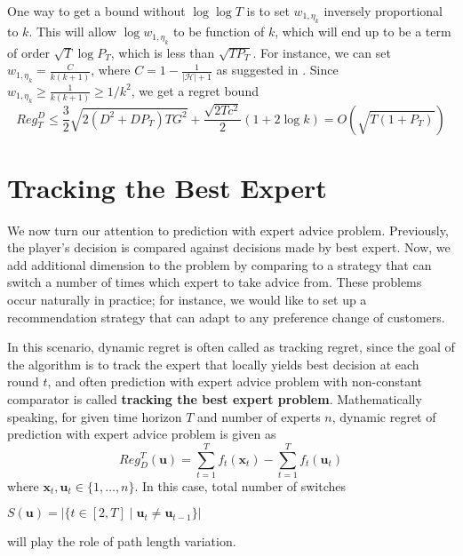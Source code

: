 \documentclass[12pt, a4paper]{report}
\begin{document}
One way to get a bound without $\log \log T$ is to set $w_{1, \eta_k}$ inversely proportional to $k$. This will allow $\log w_{1, \eta_k}$ to be function of $k$, which will end up to be a term of order $\sqrt{T}\log P_T$, which is less than $\sqrt{T P_T}$. For instance, we can set $w_{1, \eta_k} = \frac{C}{k(k+1)}$, where $C = 1 - \frac{1}{|\mathcal{H}|+1}$ as suggested in \cite{Zhang2018AdaptiveOL}. Since $w_{1, \eta_k} \geq \frac{1}{k(k+1)} \geq 1/k^2$, we get a regret bound
\begin{equation*}
    Reg_T^D \leq \frac{3}{2}\sqrt{2(D^2 + DP_T)TG^2} + \frac{\sqrt{2Tc^2}}{2}(1 + 2 \log k) = O(\sqrt{T(1 + P_T)})
\end{equation*}


\section{Tracking the Best Expert}
We now turn our attention to prediction with expert advice problem. Previously, the player's decision is compared against decisions made by best expert. Now, we add additional dimension to the problem by comparing to a strategy that can switch a number of times which expert to take advice from. These problems occur naturally in practice; for instance, we would like to set up a recommendation strategy that can adapt to any preference change of customers. 

In this scenario, dynamic regret is often called as tracking regret, since the goal of the algorithm is to track the expert that locally yields best decision at each round $t$, and often prediction with expert advice problem with non-constant comparator is called \textbf{tracking the best expert problem}. Mathematically speaking, for given time horizon $T$ and number of experts $n$, dynamic regret of prediction with expert advice problem is given as
\begin{equation*}
    Reg_D^T(\mathbf{u}) = \sum_{t=1}^T f_t(\mathbf{x}_t) - \sum_{t=1}^T f_t(\mathbf{u}_t)
\end{equation*}
where $\mathbf{x}_t, \mathbf{u}_t \in \{1, \dots, n\}$. In this case, total number of switches
\begin{center}
    $S(\mathbf{u}) = |\{t \in [2, T] \mid \mathbf{u}_t \neq \mathbf{u}_{t-1}\}|$
\end{center} 
will play the role of path length variation.  
\end{document}
